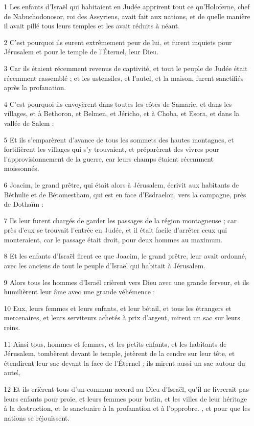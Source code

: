 \par 1 Les enfants d'Israël qui habitaient en Judée apprirent tout ce qu'Holoferne, chef de Nabuchodonosor, roi des Assyriens, avait fait aux nations, et de quelle manière il avait pillé tous leurs temples et les avait réduits à néant.
\par 2 C'est pourquoi ils eurent extrêmement peur de lui, et furent inquiets pour Jérusalem et pour le temple de l'Éternel, leur Dieu.
\par 3 Car ils étaient récemment revenus de captivité, et tout le peuple de Judée était récemment rassemblé ; et les ustensiles, et l'autel, et la maison, furent sanctifiés après la profanation.
\par 4 C'est pourquoi ils envoyèrent dans toutes les côtes de Samarie, et dans les villages, et à Bethoron, et Belmen, et Jéricho, et à Choba, et Esora, et dans la vallée de Salem :
\par 5 Et ils s'emparèrent d'avance de tous les sommets des hautes montagnes, et fortifièrent les villages qui s'y trouvaient, et préparèrent des vivres pour l'approvisionnement de la guerre, car leurs champs étaient récemment moissonnés.
\par 6 Joacim, le grand prêtre, qui était alors à Jérusalem, écrivit aux habitants de Béthulie et de Bétomestham, qui est en face d'Esdraelon, vers la campagne, près de Dothaïm :
\par 7 Ils leur furent chargés de garder les passages de la région montagneuse ; car près d'eux se trouvait l'entrée en Judée, et il était facile d'arrêter ceux qui monteraient, car le passage était droit, pour deux hommes au maximum.
\par 8 Et les enfants d'Israël firent ce que Joacim, le grand prêtre, leur avait ordonné, avec les anciens de tout le peuple d'Israël qui habitait à Jérusalem.
\par 9 Alors tous les hommes d'Israël crièrent vers Dieu avec une grande ferveur, et ils humilièrent leur âme avec une grande véhémence :
\par 10 Eux, leurs femmes et leurs enfants, et leur bétail, et tous les étrangers et mercenaires, et leurs serviteurs achetés à prix d'argent, mirent un sac sur leurs reins.
\par 11 Ainsi tous, hommes et femmes, et les petits enfants, et les habitants de Jérusalem, tombèrent devant le temple, jetèrent de la cendre sur leur tête, et étendirent leur sac devant la face de l'Éternel ; ils mirent aussi un sac autour du autel,
\par 12 Et ils crièrent tous d'un commun accord au Dieu d'Israël, qu'il ne livrerait pas leurs enfants pour proie, et leurs femmes pour butin, et les villes de leur héritage à la destruction, et le sanctuaire à la profanation et à l'opprobre. , et pour que les nations se réjouissent.
